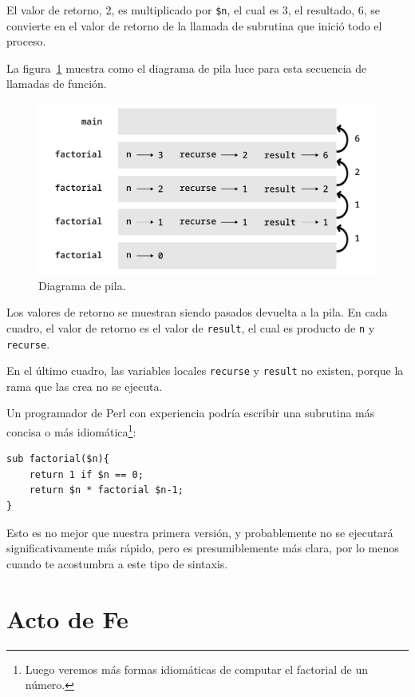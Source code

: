 El valor de retorno, 2, es multiplicado por \verb|$n|, el cual es 3,
el resultado, 6, se convierte en el valor de retorno de la llamada
de subrutina que inició todo el proceso.

La figura~\ref{fig.stack3} muestra como el diagrama de pila luce para esta
secuencia de llamadas de función.

\begin{figure}
\centerline
{\includegraphics[scale=0.7]{figs/stack3.pdf}}
\caption{Diagrama de pila.}
\label{fig.stack3}
\end{figure}

Los valores de retorno se muestran siendo pasados devuelta a la pila. En cada
cuadro, el valor de retorno es el valor de {\tt result}, el cual es 
producto de {\tt n} y {\tt recurse}.

En el último cuadro, las variables locales {\tt recurse} y {\tt result}
no existen, porque la rama que las crea no se ejecuta.

Un programador de Perl con experiencia podría escribir una
subrutina más concisa o más idiomática\footnote{Luego veremos 
más formas idiomáticas de computar el factorial de un número.}:

\begin{verbatim}
sub factorial($n){
    return 1 if $n == 0;
    return $n * factorial $n-1;
}
\end{verbatim}
%
Esto es no mejor que nuestra primera versión, y probablemente
no se ejecutará significativamente más rápido, pero es presumiblemente
más clara, por lo menos cuando te acostumbra a este tipo de sintaxis.

\section{Acto de Fe}

